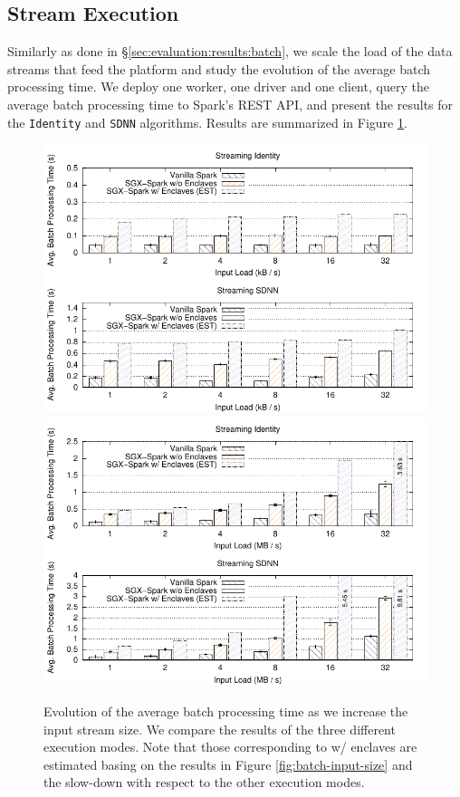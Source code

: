 \vspace{-19pt}

\subsection{Stream Execution} \label{sec:evaluation:results:stream}

\vspace{-8pt}

Similarly as done in \S\ref{sec:evaluation:results:batch}, we scale the load of the data streams that feed the platform and study the evolution of the average batch processing time.
We deploy one worker, one driver and one client, query the average batch processing time to Spark's REST API, and present the results for the \texttt{Identity} and \texttt{SDNN} algorithms. 
Results are summarized in Figure \ref{fig:throughput}.

\begin{figure}[h!]
    \centering
    \includegraphics[width=.85\textwidth]{plots/stream/input_size/throughput.pdf}
    \includegraphics[width=.85\textwidth]{plots/stream/input_size/big_throughput.pdf}
    \caption[Evolution of the average batch processing time as we increase the input stream size.]{Evolution of the average batch processing time as we increase the input stream size. We compare the results of the three different execution modes. Note that those corresponding to \sgxspark w/ enclaves are estimated basing on the results in Figure \ref{fig:batch-input-size} and the slow-down with respect to the other execution modes. \label{fig:throughput}}
\end{figure}

